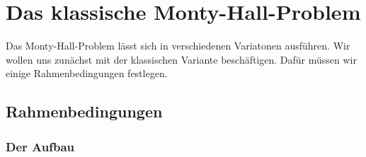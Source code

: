 \chapter{Das klassische Monty-Hall-Problem}

Das Monty-Hall-Problem lässt sich in verschiedenen Variatonen ausführen. Wir wollen uns zunächst mit der klassischen Variante beschäftigen. Dafür müssen wir einige Rahmenbedingungen festlegen.


\section{Rahmenbedingungen}

\subsection{Der Aufbau}


